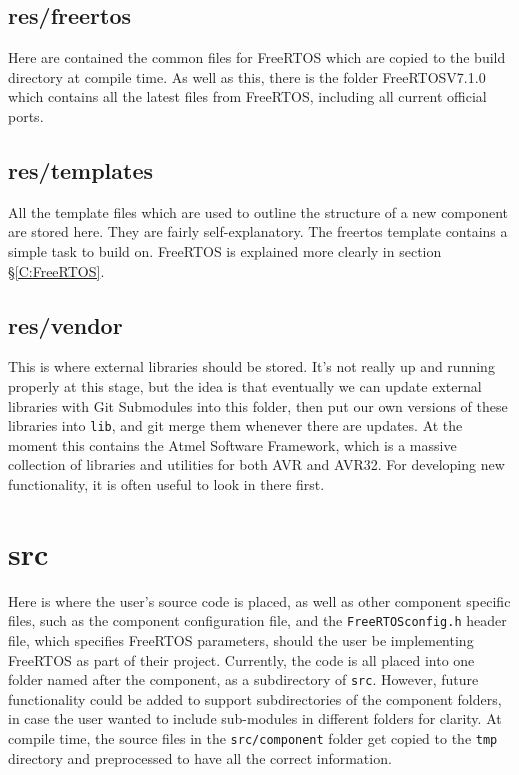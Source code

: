 \documentclass[a4paper, oneside, 11pt, titlepage, onecolumn, openright]{report}
\begin{document}
		
\subsection{res/freertos}
			\label{ss:res/freertos}
			Here are contained the common files for FreeRTOS which are copied to the build directory at compile time. As well as this, there is the folder FreeRTOSV7.1.0 which contains all the latest files from FreeRTOS, including all current official ports. 
			
\subsection{res/templates}
			\label{ss:res/templates}
			All the template files which are used to outline the structure of a new component are stored here. They are fairly self-explanatory. The freertos template contains a simple task to build on. FreeRTOS is explained more clearly in section \S\ref{C:FreeRTOS}.
			
\subsection{res/vendor}
			\label{ss:res/vendor}
			This is where external libraries should be stored. It's not really up and running properly at this stage, but the idea is that eventually we can update external libraries with Git Submodules into this folder, then put our own versions of these libraries into \texttt{lib}, and git merge them whenever there are updates. At the moment this contains the Atmel Software Framework, which is a massive collection of libraries and utilities for both AVR and AVR32. For developing new functionality, it is often useful to look in there first.
			
\section{src}
			\label{s:src}
			Here is where the user's source code is placed, as well as other component specific files, such as the component configuration file, and the \texttt{FreeRTOSconfig.h} header file, which specifies FreeRTOS parameters, should the user be implementing FreeRTOS as part of their project.
			Currently, the code is all placed into one folder named after the component, as a subdirectory of \texttt{src}. However, future functionality could be added to support subdirectories of the component folders, in case the user wanted to include sub-modules in different folders for clarity.
			At compile time, the source files in the \texttt{src/component} folder get copied to the \texttt{tmp} directory and preprocessed to have all the correct information.
			
\end{document}
